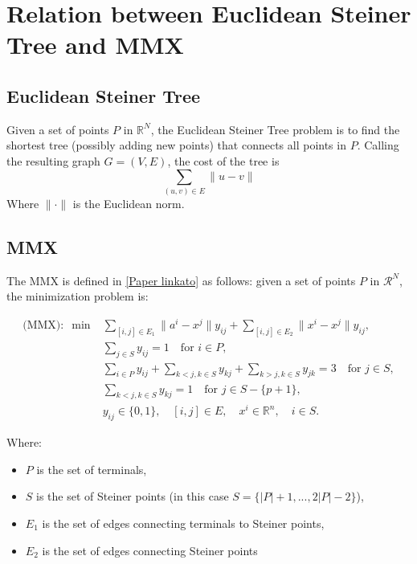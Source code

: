 \section{Relation between Euclidean Steiner Tree and MMX}

\subsection{Euclidean Steiner Tree}

Given a set of points $P$ in $\mathbb{R}^N$, the Euclidean Steiner Tree problem is to find the shortest tree (possibly
adding new points) that connects all points in $P$. Calling the resulting graph $G = (V, E)$, the cost of the tree is
\begin{equation}
    \sum_{(u, v) \in E} \|u - v\|
\end{equation}
Where $\| \cdot \|$ is the Euclidean norm.

\subsection{MMX}
The MMX is defined in \ref{Paper linkato} as follows: given a set of points $P$ in $\mathcal{R}^N$, the minimization problem is:

\begin{align}
    \text{(MMX)}: \; \min &\sum_{[i,j] \in E_1} \|a^i - x^j\| y_{ij} + \sum_{[i,j] \in E_2} \|x^i - x^j\| y_{ij}, \\
    & \sum_{j \in S} y_{ij} = 1 \quad \text{for } i \in P, \\
    & \sum_{i \in P} y_{ij} + \sum_{k < j, k \in S} y_{kj} + \sum_{k > j, k \in S} y_{jk} = 3 \quad \text{for } j \in S, \label{MMX:connectivity_steiner} \\
    & \sum_{k < j, k \in S} y_{kj} = 1 \quad \text{for } j \in S - \{p+1\},  \\
    & y_{ij} \in \{0, 1\}, \quad [i, j] \in E, \quad x^i \in \mathbb{R}^n, \quad i \in S.
\end{align}

Where: \begin{itemize}
           \item $P$ is the set of terminals,
           \item $S$ is the set of Steiner points (in this case $S = \{|P| + 1, ..., 2|P|-2\}$),
           \item $E_1$ is the set of edges connecting terminals to Steiner points,
           \item $E_2$ is the set of edges connecting Steiner points
\end{itemize}

